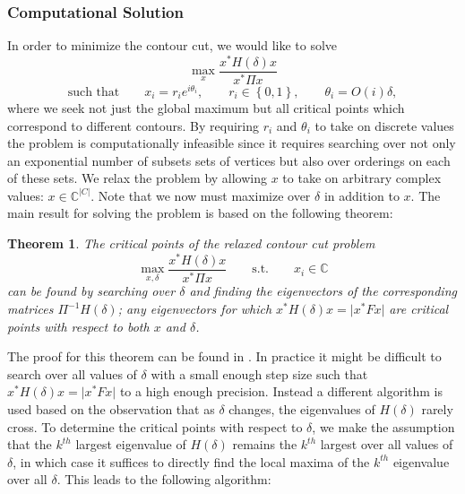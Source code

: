 \documentclass{SMBV12}
\newtheorem{theorem}{Theorem}[section]
\begin{document}
\subsubsection{Computational Solution}
In order to minimize the contour cut, we would like to solve
\begin{equation}
\max_x \dfrac{x^*H(\delta)x}{x^* \Pi x} 
\end{equation}
\begin{equation*}
 \mbox{such that} \qquad x_i = r_ie^{i\theta_i}, \qquad r_i \in \left\lbrace 0, 1 \right\rbrace, \qquad \theta_i = O(i)\delta,
\end{equation*}
where we seek not just the global maximum but all critical points which correspond to different contours. By requiring $r_i$ and $\theta_i$ to take on discrete values the problem is computationally infeasible since it requires searching over not only an exponential number of subsets sets of vertices but also over orderings on each of these sets. We relax the problem by allowing $x$ to take on arbitrary complex values: $x \in \mathbb{C}^{\lvert C \rvert}$. Note that we now must maximize over $\delta$ in addition to $x$. The main result for solving the problem is based on the following theorem:
\begin{theorem}
\label{theorem:hermitian}
The critical points of the relaxed contour cut problem
\begin{equation}
\max_{x, \delta} \dfrac{x^*H(\delta)x}{x^* \Pi x} \qquad \mbox{s.t.} \qquad x_i \in \mathbb{C}
\label{eq:hermitian}
\end{equation}
can be found by searching over $\delta$ and finding the eigenvectors of the corresponding matrices $\Pi^{-1}H(\delta)$; any eigenvectors for which $x^*H(\delta)x = \lvert x^*Fx \rvert$ are critical points
with respect to both $x$ and $\delta$.
\end{theorem}
The proof for this theorem can be found in \cite{KenGalShi2011}. In practice it might be difficult to search over all values of $\delta$ with a small enough step size such that $x^*H(\delta)x = \lvert x^*Fx \rvert$ to a high enough precision. Instead a different algorithm is used based on the observation that as $\delta$ changes, the eigenvalues of $H(\delta)$ rarely cross. To determine the critical points with respect to $\delta$, we make the assumption that the $k^{th}$ largest eigenvalue of $H(\delta)$ remains the $k^{th}$ largest over all values of $\delta$, in which case it suffices to directly find the local maxima of the $k^{th}$ eigenvalue over all $\delta$. This leads to the following algorithm:
\end{document}
